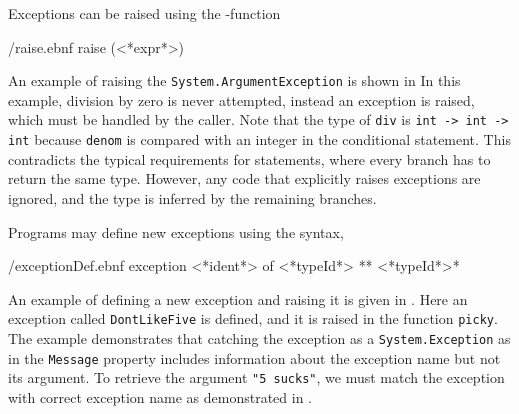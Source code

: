 Exceptions can be raised using the -function
%
\begin{verbatimwrite}{\ebnf/raise.ebnf}
raise (<*expr*>)
\end{verbatimwrite}
%
An example of raising the \lstinline{System.ArgumentException} is shown in 
% 
%
In this example, division by zero is never attempted, instead an exception is raised, which must be handled by the caller. Note that the type of \lstinline!div! is \lstinline!int -> int -> int! because \lstinline{denom} is compared with an integer in the conditional statement. This contradicts the typical requirements for  statements, where every branch has to return the same type. However, any code that explicitly raises exceptions are ignored, and the type is inferred by the remaining branches.

Programs may define new exceptions using the syntax,
%
\begin{verbatimwrite}{\ebnf/exceptionDef.ebnf}
exception <*ident*> of <*typeId*> {** <*typeId*>*} 
\end{verbatimwrite}
%
An example of defining a new exception and raising it is given in .
%
%
Here an exception called \lstinline!DontLikeFive! is defined, and it is raised in the function \lstinline!picky!. The example demonstrates that catching the exception as a \lstinline{System.Exception} as in  the \lstinline{Message} property includes information about the exception name but not its argument. To retrieve the argument \lstinline{"5 sucks"}, we must match the exception with correct exception name as demonstrated in . 
%
%

